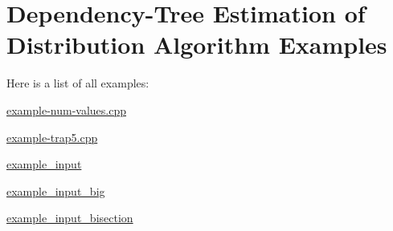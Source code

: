 \section{Dependency-Tree Estimation of Distribution Algorithm Examples}
Here is a list of all examples:\begin{CompactItemize}
\item 
\hyperlink{example-num-values_8cpp-example}{example-num-values.cpp}
\item 
\hyperlink{example-trap5_8cpp-example}{example-trap5.cpp}
\item 
\hyperlink{example__input-example}{example\_\-input}
\item 
\hyperlink{example__input__big-example}{example\_\-input\_\-big}
\item 
\hyperlink{example__input__bisection-example}{example\_\-input\_\-bisection}
\end{CompactItemize}
